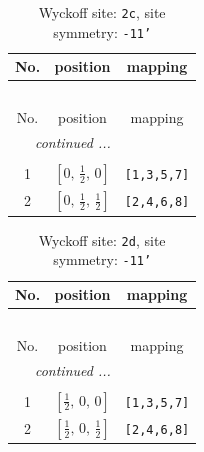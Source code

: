 \documentclass[fleqn,8pt]{jsarticle}
\begin{document}
\renewcommand{\arraystretch}{1.2}
\begin{longtable}{ccc}
\caption{Wyckoff site: {\tt 2c}, site symmetry: {\tt -11'}}
 \\
 \hline \hline
No. & position & mapping \\ \hline \endfirsthead

\multicolumn{2}{l}{\tablename\ \thetable{}} \\
 \hline \hline
No. & position & mapping \\ \hline \endhead

 \hline \hline
\multicolumn{2}{r}{\footnotesize\it continued ...} \\ \endfoot

 \hline \hline
\multicolumn{2}{r}{} \\ \endlastfoot

1 & $\left[ 0,\, \frac{1}{2},\, 0 \right]$ & {\tt [1,3,5,7]} \\ \hline
2 & $\left[ 0,\, \frac{1}{2},\, \frac{1}{2} \right]$ & {\tt [2,4,6,8]} \\
\end{longtable}
\renewcommand{\arraystretch}{1.2}
\begin{longtable}{ccc}
\caption{Wyckoff site: {\tt 2d}, site symmetry: {\tt -11'}}
 \\
 \hline \hline
No. & position & mapping \\ \hline \endfirsthead

\multicolumn{2}{l}{\tablename\ \thetable{}} \\
 \hline \hline
No. & position & mapping \\ \hline \endhead

 \hline \hline
\multicolumn{2}{r}{\footnotesize\it continued ...} \\ \endfoot

 \hline \hline
\multicolumn{2}{r}{} \\ \endlastfoot

1 & $\left[ \frac{1}{2},\, 0,\, 0 \right]$ & {\tt [1,3,5,7]} \\ \hline
2 & $\left[ \frac{1}{2},\, 0,\, \frac{1}{2} \right]$ & {\tt [2,4,6,8]} \\
\end{longtable}
\renewcommand{\arraystretch}{1.2}
\end{document}

